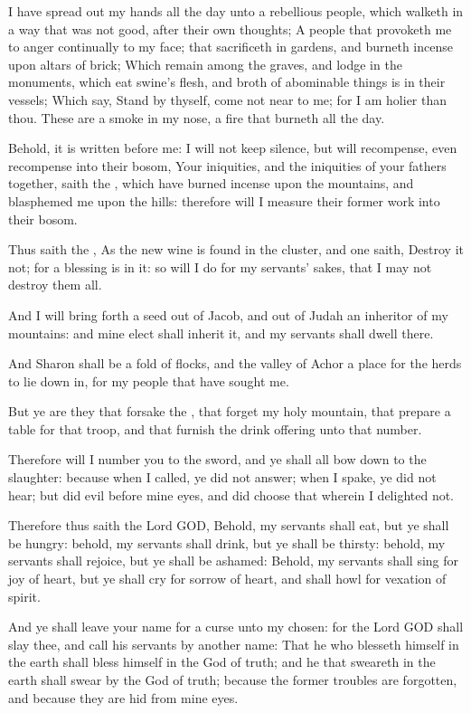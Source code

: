 \verse I have spread out my hands all the day unto a rebellious people, which walketh in a way that was not good, after their own thoughts; \verse A people that provoketh me to anger continually to my face; that sacrificeth in gardens, and burneth incense upon altars of brick; \verse Which remain among the graves, and lodge in the monuments, which eat swine's flesh, and broth of abominable things is in their vessels; \verse Which say, Stand by thyself, come not near to me; for I am holier than thou. These are a smoke in my nose, a fire that burneth all the day.

\verse Behold, it is written before me: I will not keep silence, but will recompense, even recompense into their bosom, \verse Your iniquities, and the iniquities of your fathers together, saith the \LORD, which have burned incense upon the mountains, and blasphemed me upon the hills: therefore will I measure their former work into their bosom.

\verse Thus saith the \LORD, As the new wine is found in the cluster, and one saith, Destroy it not; for a blessing is in it: so will I do for my servants' sakes, that I may not destroy them all.

\verse And I will bring forth a seed out of Jacob, and out of Judah an inheritor of my mountains: and mine elect shall inherit it, and my servants shall dwell there.

\verse And Sharon shall be a fold of flocks, and the valley of Achor a place for the herds to lie down in, for my people that have sought me.

\verse But ye are they that forsake the \LORD, that forget my holy mountain, that prepare a table for that troop, and that furnish the drink offering unto that number.

\verse Therefore will I number you to the sword, and ye shall all bow down to the slaughter: because when I called, ye did not answer; when I spake, ye did not hear; but did evil before mine eyes, and did choose that wherein I delighted not.

\verse Therefore thus saith the Lord GOD, Behold, my servants shall eat, but ye shall be hungry: behold, my servants shall drink, but ye shall be thirsty: behold, my servants shall rejoice, but ye shall be ashamed: \verse Behold, my servants shall sing for joy of heart, but ye shall cry for sorrow of heart, and shall howl for vexation of spirit.

\verse And ye shall leave your name for a curse unto my chosen: for the Lord GOD shall slay thee, and call his servants by another name: \verse That he who blesseth himself in the earth shall bless himself in the God of truth; and he that sweareth in the earth shall swear by the God of truth; because the former troubles are forgotten, and because they are hid from mine eyes.

